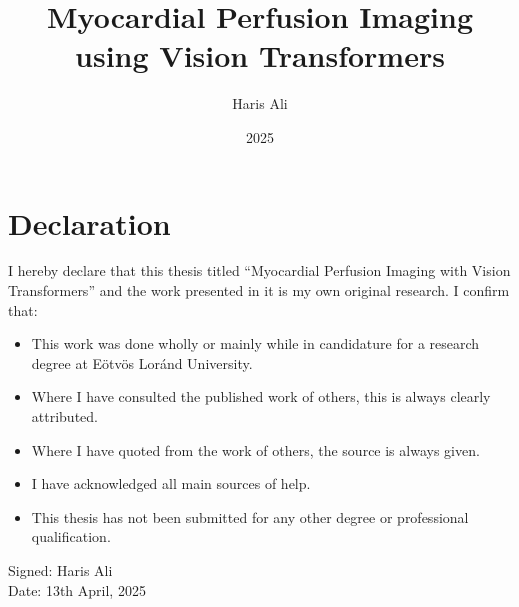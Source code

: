 \documentclass[
]{elteikthesis}[2024/04/26]
\title{Myocardial Perfusion Imaging using Vision Transformers} %
\date{2025} %
\author{Haris Ali}
\affiliation{PhD Candidate} %
\begin{document}


\maketitle
%

\chapter*{Declaration}

I hereby declare that this thesis titled “Myocardial Perfusion Imaging with Vision Transformers” and the work presented in it is my own original research. I confirm that:

\begin{itemize}
    \item This work was done wholly or mainly while in candidature for a research degree at Eötvös Loránd University.
    \item Where I have consulted the published work of others, this is always clearly attributed.
    \item Where I have quoted from the work of others, the source is always given.
    \item I have acknowledged all main sources of help.
    \item This thesis has not been submitted for any other degree or professional qualification.
\end{itemize}

\vspace{1cm}
\noindent
Signed: Haris Ali \\
\vspace{0.2cm}
Date: 13th April, 2025


\cleardoublepage

\tableofcontents
\cleardoublepage


\cleardoublepage


\cleardoublepage


\cleardoublepage


\cleardoublepage
\end{document}
